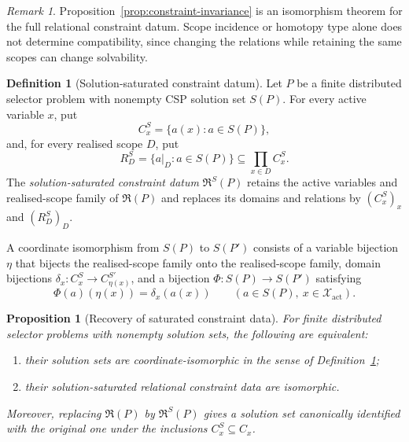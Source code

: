 \documentclass[11pt]{article}
\theoremstyle{plain}
\newtheorem{proposition}[theorem]{Proposition}
\theoremstyle{definition}
\newtheorem{definition}[theorem]{Definition}
\theoremstyle{remark}
\newtheorem{remark}[theorem]{Remark}
\begin{document}
\begin{remark}
Proposition~\ref{prop:constraint-invariance} is an isomorphism theorem for the
full relational constraint datum. Scope incidence or homotopy type alone does
not determine compatibility, since changing the relations while retaining the
same scopes can change solvability.
\end{remark}


\begin{definition}[Solution-saturated constraint datum]
\label{def:saturated-constraint-datum}
Let $P$ be a finite distributed selector problem with nonempty CSP solution set
$S(P)$. For every active variable $x$, put
\[
C_x^{S}=\{a(x):a\in S(P)\},
\]
and, for every realised scope $D$, put
\[
R_D^{S}=\{a|_D:a\in S(P)\}
\subseteq\prod_{x\in D}C_x^{S}.
\]
The \emph{solution-saturated constraint datum}
$\mathfrak R^{S}(P)$ retains the active variables and realised-scope family of
$\mathfrak R(P)$ and replaces its domains and relations by
$(C_x^{S})_x$ and $(R_D^{S})_D$.

A coordinate isomorphism from $S(P)$ to $S(P')$ consists of a variable
bijection $\eta$ that bijects the realised-scope family onto the realised-scope
family, domain bijections
$\delta_x:C_x^{S}\to C_{\eta(x)}^{S'}$, and a bijection
$\Phi:S(P)\to S(P')$ satisfying
\[
\Phi(a)(\eta(x))=\delta_x(a(x))
\qquad(a\in S(P),\ x\in\mathcal X_{\mathrm{act}}).
\]
\end{definition}

\begin{proposition}[Recovery of saturated constraint data]
\label{prop:saturated-completeness}
For finite distributed selector problems with nonempty solution sets, the
following are equivalent:
\begin{enumerate}[label=(\roman*)]
\item their solution sets are coordinate-isomorphic in the sense of
Definition~\ref{def:saturated-constraint-datum};
\item their solution-saturated relational constraint data are isomorphic.
\end{enumerate}
Moreover, replacing $\mathfrak R(P)$ by $\mathfrak R^{S}(P)$ gives a
solution set canonically identified with the original one under the inclusions
$C_x^S\subseteq C_x$.
\end{proposition}
\end{document}
